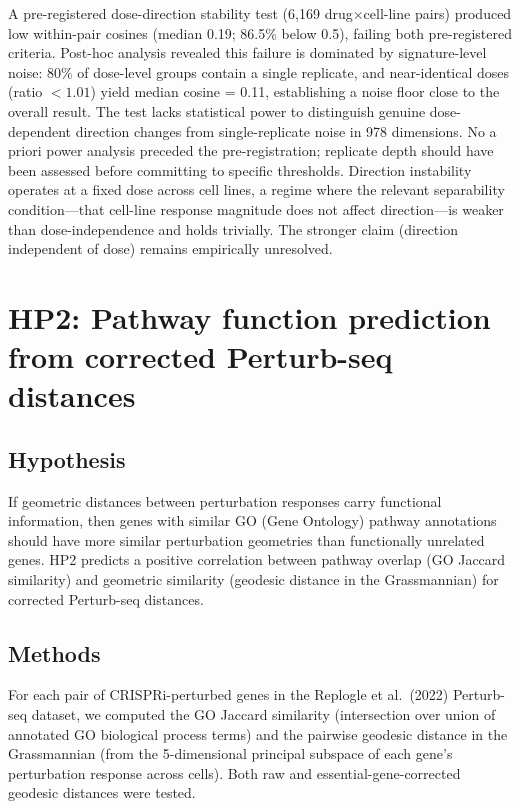 \documentclass[11pt]{article}
\begin{document}
A pre-registered dose-direction stability test (6{,}169
drug$\times$cell-line pairs) produced low within-pair cosines (median
0.19; 86.5\% below 0.5), failing both pre-registered criteria. Post-hoc
analysis revealed this failure is dominated by signature-level noise:
80\% of dose-level groups contain a single replicate, and
near-identical doses (ratio $< 1.01$) yield median cosine = 0.11,
establishing a noise floor close to the overall result. The test lacks
statistical power to distinguish genuine dose-dependent direction
changes from single-replicate noise in 978 dimensions. No a priori
power analysis preceded the pre-registration; replicate depth should
have been assessed before committing to specific thresholds.
Direction instability operates at a fixed dose across cell lines, a
regime where the relevant separability condition---that cell-line
response magnitude does not affect direction---is weaker than
dose-independence and holds trivially. The stronger claim (direction
independent of dose) remains empirically unresolved.

\section{HP2: Pathway function prediction from corrected Perturb-seq distances}
\label{sec:hp2}

\subsection{Hypothesis}

If geometric distances between perturbation responses carry functional
information, then genes with similar GO (Gene Ontology) pathway
annotations should have more similar perturbation geometries than
functionally unrelated genes.  HP2 predicts a positive correlation
between pathway overlap (GO Jaccard similarity) and geometric similarity
(geodesic distance in the Grassmannian) for corrected Perturb-seq
distances.

\subsection{Methods}

For each pair of CRISPRi-perturbed genes in the Replogle et al.\ (2022)
Perturb-seq dataset, we computed the GO Jaccard similarity (intersection
over union of annotated GO biological process terms) and the pairwise
geodesic distance in the Grassmannian (from the 5-dimensional principal
subspace of each gene's perturbation response across cells).  Both raw
and essential-gene-corrected geodesic distances were tested.
\end{document}
